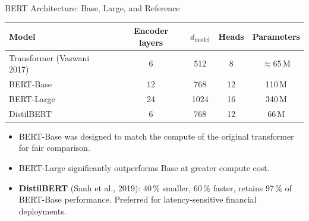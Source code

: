 \documentclass[11pt,aspectratio=169,professionalfonts]{beamer}
\begin{document}
\begin{frame}{BERT Architecture: Base, Large, and Reference}
  \begin{center}
  \renewcommand{\arraystretch}{1.3}
  \begin{tabular}{@{}lcccc@{}}
    \toprule
    \textbf{Model} & \textbf{Encoder layers}
      & $d_{\text{model}}$ & \textbf{Heads} & \textbf{Parameters}\\
    \midrule
    Transformer (Vaswani 2017) & 6  & 512  &  8 & $\approx$65\,M\\
    BERT-Base                  & 12 & 768  & 12 & 110\,M\\
    BERT-Large                 & 24 & 1024 & 16 & 340\,M\\
    DistilBERT                 &  6 & 768  & 12 &  66\,M\\
    \bottomrule
  \end{tabular}
  \end{center}

  \begin{itemize}
    \item BERT-Base was designed to match the compute of the original
          transformer for fair comparison.
    \item BERT-Large significantly outperforms Base at greater compute cost.
    \item \textbf{DistilBERT} (Sanh et al., 2019): 40\,\% smaller,
          60\,\% faster, retains 97\,\% of BERT-Base performance.
          Preferred for latency-sensitive financial deployments.
  \end{itemize}
\end{frame}
%
%
\end{document}
